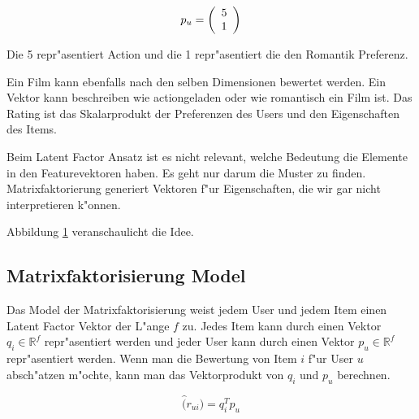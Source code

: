 \documentclass[a4paper, 12pt]{article}
\begin{document}
\begin{equation}
  \label{eq:vektor}
  p_u = \left(
  \begin{array}[c]{c}
    5 \\
    1 
  \end{array}
\right)
\end{equation}

Die 5 repr"asentiert Action und die 1 repr"asentiert die den Romantik Preferenz.

 Ein Film kann ebenfalls nach den selben Dimensionen bewertet werden. Ein Vektor kann beschreiben wie actiongeladen oder wie romantisch ein Film ist. Das Rating ist das Skalarprodukt der Preferenzen des Users und den Eigenschaften des Items.

Beim Latent Factor Ansatz ist es nicht relevant, welche Bedeutung die Elemente in den Featurevektoren haben. Es geht nur darum die Muster zu finden. Matrixfaktorierung generiert Vektoren f"ur Eigenschaften, die wir gar nicht interpretieren k"onnen.

Abbildung \ref{fig:moviedimension} veranschaulicht die Idee.

\begin{figure}
\centering
{}
\label{fig:moviedimension}
\end{figure}

\subsection{Matrixfaktorisierung Model}
\label{sec:matrixfactorizationmodel}

Das Model der Matrixfaktorisierung weist jedem User und jedem Item einen Latent Factor Vektor der L"ange $f$ zu. Jedes Item kann durch einen Vektor $q_i \in \mathbb{R}^f$ repr"asentiert werden und jeder User kann durch einen Vektor $p_u \in \mathbb{R}^f$ repr"asentiert werden. Wenn man die Bewertung von Item $i$ f"ur User $u$ absch"atzen m"ochte, kann man das Vektorprodukt von $q_i$ und $p_u$ berechnen.

\begin{equation}
  \label{eq:rui}
  \hat(r_{ui}) = q_i^T p_u
\end{equation}
\end{document}

